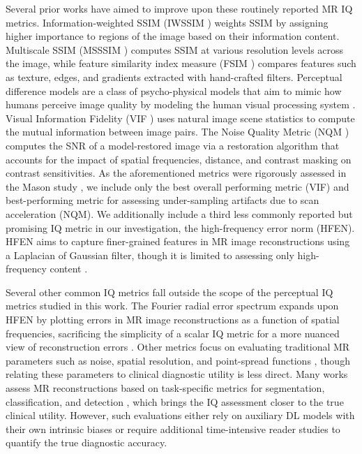 \documentclass[AMA,STIX2COL,Linenumberson]{MRM}
\begin{document}
Several prior works have aimed to improve upon these routinely reported MR IQ metrics. Information-weighted SSIM (IWSSIM \cite{wang2010information}) weights SSIM by assigning higher importance to regions of the image based on their information content. Multiscale SSIM (MSSSIM \cite{wang2003multiscale}) computes SSIM at various resolution levels across the image, while feature similarity index measure (FSIM \cite{zhang2011fsim}) compares features such as texture, edges, and gradients extracted with hand-crafted filters. Perceptual difference models are a class of psycho-physical models that aim to mimic how humans perceive image quality by modeling the human visual processing system \cite{miao2008quantitative, mantiuk2011hdr, miao2013new, salem2002validation, daly1992visible}. Visual Information Fidelity (VIF \cite{sheikh2006image}) uses natural image scene statistics to compute the mutual information between image pairs. The Noise Quality Metric (NQM \cite{damera2000image}) computes the SNR of a model-restored image via a restoration algorithm that accounts for the impact of spatial frequencies, distance, and contrast masking on contrast sensitivities. As the aforementioned metrics were rigorously assessed in the Mason study \cite{mason2019comparison}, we include only the best overall performing metric (VIF) and best-performing metric for assessing under-sampling artifacts due to scan acceleration (NQM). We additionally include a third less commonly reported but promising IQ metric in our investigation, the high-frequency error norm (HFEN). HFEN aims to capture finer-grained features in MR image reconstructions using a Laplacian of Gaussian filter, though it is limited to assessing only high-frequency content \cite{ravishankar2010mr}.

Several other common IQ metrics fall outside the scope of the perceptual IQ metrics studied in this work. The Fourier radial error spectrum expands upon HFEN by plotting errors in MR image reconstructions as a function of spatial frequencies, sacrificing the simplicity of a scalar IQ metric for a more nuanced view of reconstruction errors \cite{kim2018fourier}. Other metrics focus on evaluating traditional MR parameters such as noise, spatial resolution, and point-spread functions \cite{chan2021local, kleineisel2023assessment}, though relating these parameters to clinical diagnostic utility is less direct. Many works assess MR reconstructions based on task-specific metrics for segmentation, classification, and detection \cite{desai2022skm, zhao2021end, zhao2022fastmri+}, which brings the IQ assessment closer to the true clinical utility. However, such evaluations either rely on auxiliary DL models with their own intrinsic biases or require additional time-intensive reader studies to quantify the true diagnostic accuracy.
\end{document}
